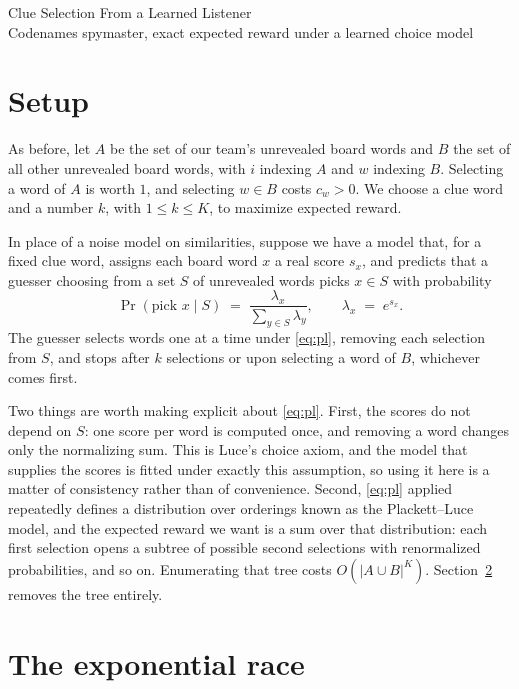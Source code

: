 \documentclass[12pt]{article}
\begin{document}
\begin{center}
  {\LARGE Clue Selection From a Learned Listener}\\[0.7em]
  Codenames spymaster, exact expected reward under a learned choice model
\end{center}
\vspace{1.5em}

\section{Setup}
\label{sec:setup}

As before, let $A$ be the set of our team's unrevealed board words and $B$ the
set of all other unrevealed board words, with $i$ indexing $A$ and $w$
indexing $B$. Selecting a word of $A$ is worth $1$, and selecting $w \in B$
costs $c_w > 0$. We choose a clue word and a number $k$, with $1 \le k \le K$,
to maximize expected reward.

In place of a noise model on similarities, suppose we have a model that, for a
fixed clue word, assigns each board word $x$ a real score $s_x$, and predicts
that a guesser choosing from a set $S$ of unrevealed words picks $x \in S$ with
probability
\begin{equation}
  \label{eq:pl}
  \Pr(\text{pick } x \mid S) \;=\; \frac{\lambda_x}{\sum_{y \in S} \lambda_y},
  \qquad \lambda_x \;=\; e^{s_x}.
\end{equation}
The guesser selects words one at a time under \eqref{eq:pl}, removing each
selection from $S$, and stops after $k$ selections or upon selecting a word of
$B$, whichever comes first.

Two things are worth making explicit about \eqref{eq:pl}. First, the scores do
not depend on $S$: one score per word is computed once, and removing a word
changes only the normalizing sum. This is Luce's choice axiom, and the model
that supplies the scores is fitted under exactly this assumption, so using it
here is a matter of consistency rather than of convenience. Second,
\eqref{eq:pl} applied repeatedly defines a distribution over orderings known as
the Plackett--Luce model, and the expected reward we want is a sum over that
distribution: each first selection opens a subtree of possible second
selections with renormalized probabilities, and so on. Enumerating that tree
costs $O(|A \cup B|^{K})$. Section~\ref{sec:race} removes the tree entirely.

\section{The exponential race}
\label{sec:race}
\end{document}
